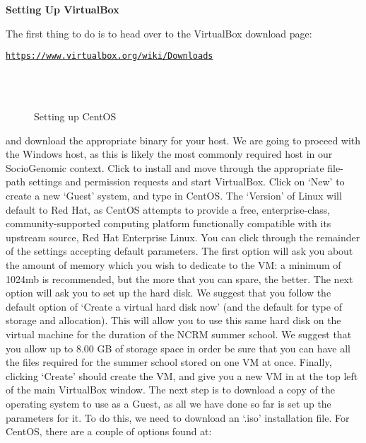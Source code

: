 \documentclass[10pt]{article}
\begin{document}
\textbf{Setting Up VirtualBox}

The first thing to do is to head over to the VirtualBox download page: 

\begin{center}
\href{https://www.virtualbox.org/wiki/Downloads}{\texttt{https://www.virtualbox.org/wiki/Downloads}}
\end{center}

\begin{figure}[!t]
\centering  
\caption{Setting up CentOS}\label{figure_7}
\hspace{0.65in}
\\
\hspace{0.65in}
\\
\normalsize
\end{figure}

and download the appropriate binary for your host. We are going to proceed with the Windows host, as this is likely the most commonly required host in our SocioGenomic context. Click to install and move through the appropriate file-path settings and permission requests and start VirtualBox. Click on `New' to create a new `Guest' system, and type in CentOS. The `Version' of Linux will default to Red Hat, as CentOS attempts to provide a free, enterprise-class, community-supported computing platform functionally compatible with its upstream source, Red Hat Enterprise Linux. You can click through the remainder of the settings accepting default parameters. The first option will ask you about the amount of memory which you wish to dedicate to the VM: a minimum of 1024mb is recommended, but the more that you can spare, the better. The next option will ask you to set up the hard disk. We suggest that you follow the default option of `Create a virtual hard disk now' (and the default for type of storage and allocation). This will allow you to use this same hard disk on the virtual machine for the duration of the NCRM summer school. We suggest that you allow up to 8.00 GB of storage space in order be sure that you can have all the files required for the summer school stored on one VM at once. Finally, clicking `Create' should create the VM, and give you a new VM in at the top left of the main VirtualBox window. The next step is to download a copy of the operating system to use as a Guest, as all we have done so far is set up the parameters for it. To do this, we need to download an `.iso' installation file. For CentOS, there are a couple of options found at:
\end{document}
